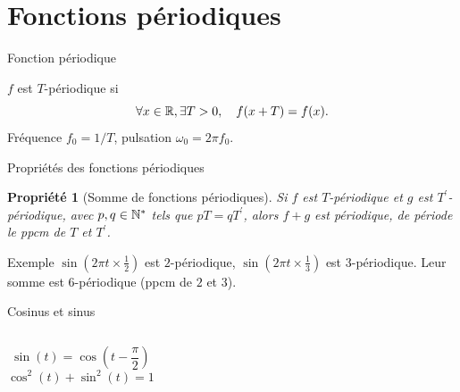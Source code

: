 \documentclass[aspectratio=43,10pt]{beamer}
\newtheorem{proposition}{Propriété}
\newcommand{\slidefig}[2]{%
\begin{center}
\resizebox{#1}{!}{}
\end{center}
}
\begin{document}
\section{Fonctions périodiques}

\begin{frame}{Fonction périodique}
    \begin{definition}
        $f$ est $T$-périodique si $$\forall x\in{\mathbb{R}}, \exists T > 0, \quad f(x+T)=f(x).$$
        Fréquence $f_0=1/T$, pulsation $\omega_0=2\pi f_0$.
    \end{definition}
    \slidefig{\textwidth}{periodic-examples.tex}
\end{frame}

\begin{frame}{Propriétés des fonctions périodiques}
    \begin{proposition}[Somme de fonctions périodiques]
        Si $f$ est $T$-périodique et $g$ est $T^\prime$-périodique, avec
        $p,q\in{\mathbb{N}}^*$ tels que $pT=qT^\prime$, alors $f+g$ est
        périodique, de période le ppcm de $T$ et $T^\prime$.
    \end{proposition}
        \small
        \begin{exampleblock}{Exemple}
        $\sin(2\pi t \times \frac{1}{2})$ est $2$-périodique, $\sin(2\pi t \times \frac{1}{3})$
        est $3$-périodique. Leur somme est $6$-périodique (ppcm de $2$
        et $3$).
        \end{exampleblock}
        \slidefig{\textwidth}{periodic-sum-example.tex}
\end{frame}

\begin{frame}{Cosinus et sinus}
    \begin{columns}
        \slidefig{\textwidth}{trig-cos-sin.tex}
        \slidefig{\textwidth}{unit-circle.tex}
    \end{columns}
    \begin{columns}
        \[
            \sin(t) = \cos\!\left(t-\frac{\pi}{2}\right)
        \]
        \[
            \cos^2(t)+\sin^2(t)=1
        \]
    \end{columns}
\end{frame}
\end{document}
